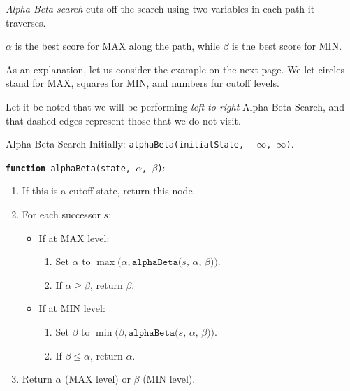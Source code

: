 \documentclass[english]{panikzettel}
\begin{document}
\begin{minipage}[t]{0.425\textwidth}
\emph{Alpha-Beta search} cuts off the search using two variables in each path it traverses.

$\alpha$ is the best score for MAX along the path, while $\beta$ is the best score for MIN.

As an explanation, let us consider the example on the next page. We let circles stand for MAX, squares for MIN, and numbers fur cutoff levels.

Let it be noted that we will be performing \emph{left-to-right} Alpha Beta Search, and that dashed edges represent those that we do not visit.

\end{minipage}\hspace{0.025\textwidth}%
\begin{minipage}[t]{0.55\textwidth}
\vspace{-\baselineskip}
\begin{algo}{Alpha Beta Search}
Initially: \texttt{alphaBeta(initialState, $-\infty$, $\infty$)}.
\medskip

\texttt{\textbf{function} alphaBeta(state, $\alpha$, $\beta$)}:
\begin{enumerate}
    \item If this is a cutoff state, return this node.
    \item For each successor $s$:
        \begin{itemize}
            \item If at MAX level:
                \begin{enumerate}
                    \item Set $\alpha$ to $\max(\alpha, \texttt{alphaBeta($s$, $\alpha$, $\beta$))}$.
                    \item If $\alpha \geq \beta$, return $\beta$.
                \end{enumerate}
            \item If at MIN level:
                \begin{enumerate}
                    \item Set $\beta$ to $\min(\beta, \texttt{alphaBeta($s$, $\alpha$, $\beta$))}$.
                    \item If $\beta \leq \alpha$, return $\alpha$.
                \end{enumerate}
        \end{itemize}
    \item Return $\alpha$ (MAX level) or $\beta$ (MIN level).
\end{enumerate}
\end{algo}
\end{minipage}
\end{document}
